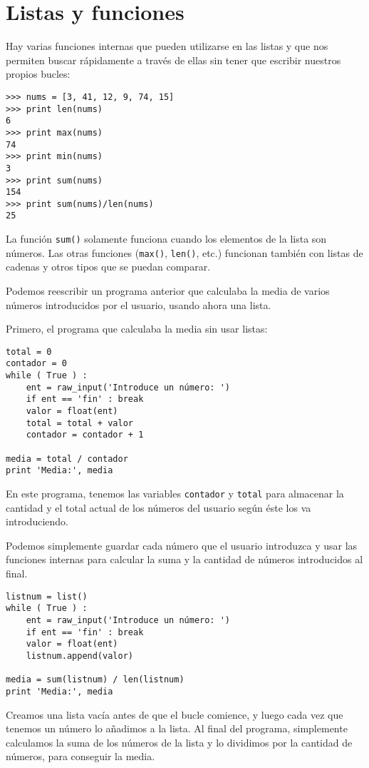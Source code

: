 \section{Listas y funciones}

Hay varias funciones internas que pueden utilizarse en las listas
y que nos permiten buscar rápidamente a través de ellas
sin tener que escribir nuestros propios bucles:

\beforeverb
\begin{verbatim}
>>> nums = [3, 41, 12, 9, 74, 15]
>>> print len(nums)
6
>>> print max(nums)
74
>>> print min(nums)
3
>>> print sum(nums)
154
>>> print sum(nums)/len(nums)
25
\end{verbatim}
\afterverb
%
La función {\tt sum()} solamente funciona cuando los elementos de la lista son números.
Las otras funciones ({\tt max()}, {\tt len()}, etc.) funcionan también con listas
de cadenas y otros tipos que se puedan comparar.

Podemos reescribir un programa anterior que calculaba la media de
varios números introducidos por el usuario, usando ahora una lista.

Primero, el programa que calculaba la media sin usar listas:

\beforeverb
\begin{verbatim}
total = 0
contador = 0
while ( True ) :
    ent = raw_input('Introduce un número: ')
    if ent == 'fin' : break
    valor = float(ent)
    total = total + valor
    contador = contador + 1

media = total / contador
print 'Media:', media
\end{verbatim}
\afterverb
%
En este programa, tenemos las variables {\tt contador} y {\tt total}
para almacenar la cantidad y el total actual de los números del usuario
según éste los va introduciendo.

Podemos simplemente guardar cada número que el usuario introduzca
y usar las funciones internas para calcular la suma y la cantidad
de números introducidos al final.

\beforeverb
\begin{verbatim}
listnum = list()
while ( True ) :
    ent = raw_input('Introduce un número: ')
    if ent == 'fin' : break
    valor = float(ent)
    listnum.append(valor)

media = sum(listnum) / len(listnum)
print 'Media:', media
\end{verbatim}
\afterverb
%
Creamos una lista vacía antes de que el bucle comience, y luego cada vez
que tenemos un número lo añadimos a la lista. Al final del
programa, simplemente calculamos la suma de los números de la
lista y lo dividimos por la cantidad de números,
para conseguir la media.

